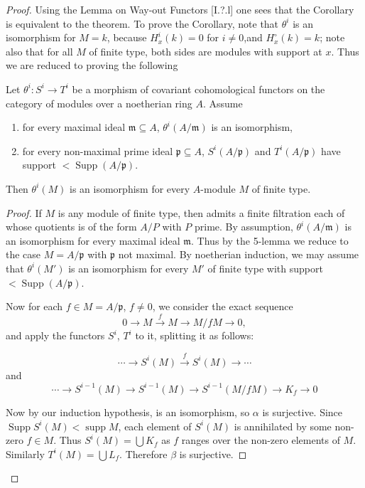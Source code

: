 \documentclass[12pt]{book}
\begin{document}
\begin{proof}
Using the Lemma on Way-out Functors [I.?.l] one sees that the Corollary is equivalent to the theorem. To prove the Corollary, note that \(\theta^{i}\) is an isomorphism for \(M=k\), because \(H_{x}^{i}(k)=0\) for \(i \neq0\),and \(H_{x}^{\circ}(k)=k\); note also that for all \(M\) of finite type, both sides are modules with support at \(x\). Thus we are reduced to proving the following

\setcounter{page}{279}
\begin{lemma}
Let \(\theta^{i}: S^{i} \to T^{i}\) be a morphism of covariant cohomological functors on the category of modules over a noetherian ring \(A\). Assume
\begin{enumerate}
\item[(i)] for every maximal ideal \(\mathfrak{m} \subseteq A\), \(\theta^{i}(A / \mathfrak{m})\) is an isomorphism,
\item[(ii)] for every non-maximal prime ideal \(\mathfrak{p} \subseteq A\), \(S^{i}(A / \mathfrak{p})\) and \(T^{i}(A / \mathfrak{p})\) have support \(< \operatorname{Supp}(A/\mathfrak{p})\).
\end{enumerate}
Then \(\theta^{i}(M)\) is an isomorphism for every \(A\)-module \(M\) of finite type.
\end{lemma}

\begin{proof}
If \(M\) is any module of finite type, then admits a finite filtration each of whose quotients is of the form \(A/P\) with \(P\) prime. By assumption, \(\theta^{i}(A / \mathfrak{m})\) is an isomorphism for every maximal ideal \(\mathfrak{m}\). Thus by the 5-lemma we reduce to the case \(M=A / \mathfrak{p}\) with \(\mathfrak{p}\) not maximal. By noetherian induction, we may assume that \(\theta^{i}(M')\) is an isomorphism for every \(M'\) of finite type with support \(< \operatorname{Supp}(A/\mathfrak{p})\).

Now for each \(f \in M=A / \mathfrak{p}\), \(f \neq0\), we consider the exact sequence
\[0 \to M \stackrel{f}{\to} M \to M / fM \to 0,\]
and apply the functors \(S^{i}\), \(T^{i}\) to it, splitting it as follows:

\setcounter{page}{280}
\[\cdots \to S^{i}(M) \stackrel{f}{\to} S^{i}(M) \to \cdots\]
and
\[\cdots \to S^{i-1}(M) \to S^{i-1}(M) \to S^{i-1}(M / f M) \to K_{f} \to 0\]

Now by our induction hypothesis, is an isomorphism, so \(\alpha\) is surjective. Since \(\operatorname{Supp}S^{i}(M)<\operatorname{supp} M\), each element of \(S^{i}(M)\) is annihilated by some non-zero \(f \in M\).
Thus \(S^{i}(M)=\bigcup K_{f}\) as \(f\) ranges over the non-zero elements of \(M\). Similarly \(T^{i}(M)=\bigcup L_{f}\). Therefore \(\beta\) is surjective.


\end{proof}
\end{proof}
\end{document}
